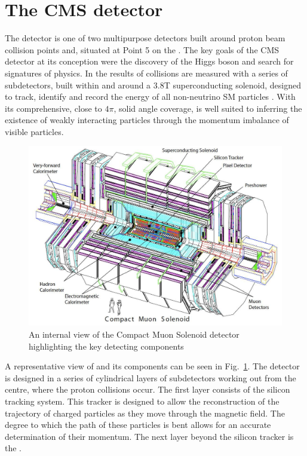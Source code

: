 \section{The CMS detector} \label{sec:cms}

The \CMS detector is one of two multipurpose
detectors built around proton beam collision points and,
situated at Point 5 on the \LHC. The key goals of the CMS detector at
its conception were the discovery of the \SM Higgs boson and search
for signatures of \BSM physics. In \CMS the results of collisions are
measured with a series of subdetectors, built within and around a 3.8T
superconducting solenoid, designed to track, identify and record the
energy of all non-neutrino SM particles \cite{Bayatian:2006zz}. With
its comprehensive, close to $4\pi$, solid angle coverage, \CMS is well
suited to inferring the existence of weakly interacting particles
through the momentum imbalance of visible particles. 

\begin{figure}
\begin{center}
\includegraphics[width=0.8\linewidth]{figs/cms_detector} \end{center}
\caption{An internal view of the Compact Muon Solenoid detector
highlighting the key detecting components \cite{Bayatian:2006zz}}
\label{fig:CMS} \end{figure}

A representative view of \CMS and its components can be seen in
Fig.~\ref{fig:CMS}. The detector is designed in a series of
cylindrical layers of subdetectors working out from the centre, where
the proton collisions occur. The first layer consists of the silicon
tracking system. This tracker is designed to allow the reconstruction
of the trajectory of charged particles as they move through the
magnetic field. The degree to which the path of these particles is
bent allows for an accurate determination of their momentum. The next
layer beyond the silicon tracker is the \ECAL. 

